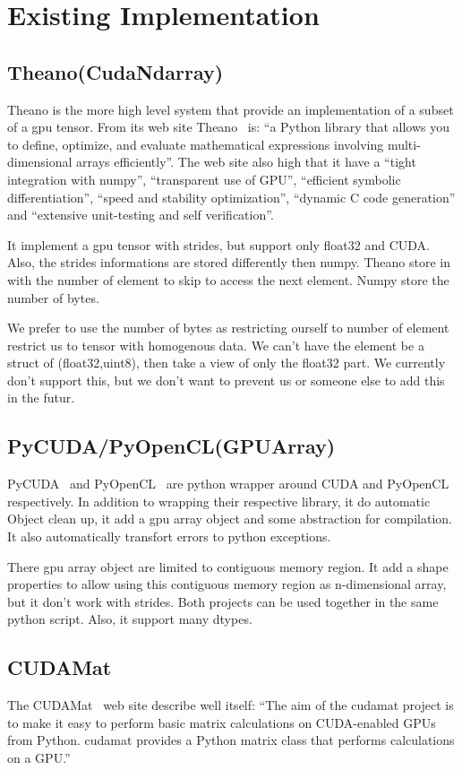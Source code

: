 \documentclass{article} %
\begin{document}
\section{Existing Implementation}
\subsection{Theano(CudaNdarray)}
Theano is the more high level system that provide an implementation of a subset of a gpu tensor. From its web site Theano~\citep{bergstra+al:2010-scipy} is:
``a Python library that allows you to define, optimize, and evaluate mathematical expressions involving multi-dimensional arrays efficiently''. The web site also high that it have a ``tight integration with numpy'', ``transparent use of GPU'', ``efficient symbolic differentiation'', ``speed and stability optimization'', ``dynamic C code generation'' and ``extensive unit-testing and self verification''.

It implement a gpu tensor with strides, but support only float32 and CUDA. Also, the strides informations are stored differently then numpy. Theano store in with the number of element to skip to access the next element. Numpy store the number of bytes.

We prefer to use the number of bytes as restricting ourself to number of element restrict us to tensor with homogenous data. We can't have the element be a struct of (float32,uint8), then take a view of only the float32 part. We currently don't support this, but we don't want to prevent us or someone else to add this in the futur.

\subsection{PyCUDA/PyOpenCL(GPUArray)}
PyCUDA~\citep{kloeckner_pycuda_2009} and PyOpenCL~\citep{kloeckner_pycuda_2009} are python wrapper around CUDA and PyOpenCL respectively. In addition to wrapping their respective library, it do automatic Object clean up, it add a gpu array object and some abstraction for compilation. It also automatically transfort errors to python exceptions.

There gpu array object are limited to contiguous memory region. It add a shape properties to allow using this contiguous memory region as n-dimensional array, but it don't work with strides. Both projects can be used together in the same python script. Also, it support many dtypes.

\subsection{CUDAMat}
The CUDAMat~\citep{cudamat-TR2009} web site describe well itself: ``The aim of the cudamat project is to make it easy to perform basic matrix calculations on CUDA-enabled GPUs from Python. cudamat provides a Python matrix class that performs calculations on a GPU.''
\end{document}
